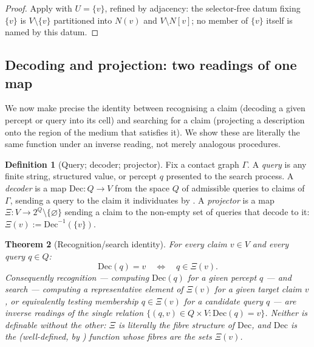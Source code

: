 \documentclass[11pt,twocolumn,a4paper]{article}
\theoremstyle{thmstyle}
\newtheorem{theorem}{Theorem}[section]
\theoremstyle{definition}
\newtheorem{definition}[theorem]{Definition}
\theoremstyle{remark}
\newcommand{\Gph}{\Gamma}
\newcommand{\V}{V}
\newcommand{\Proj}{\Xi}
\begin{document}
\begin{proof}
Apply  with $U=\{v\}$, refined by adjacency: the
selector-free datum fixing $\{v\}$ is $\V\setminus\{v\}$ partitioned into
$N(v)$ and $\V\setminus N[v]$; no member of $\{v\}$ itself is named by
this datum.
\end{proof}

\subsection{Decoding and projection: two readings of one map}

We now make precise the identity between recognising a claim (decoding a
given percept or query into its cell) and searching for a claim
(projecting a description onto the region of the medium that satisfies
it). We show these are literally the same function under an inverse
reading, not merely analogous procedures.

\begin{definition}[Query; decoder; projector]
\label{def:decoder}
Fix a contact graph $\Gph$. A \emph{query} is any finite string, structured
value, or percept $q$ presented to the search process. A \emph{decoder} is
a map $\mathrm{Dec}\colon Q\to\V$ from the space $Q$ of admissible queries
to claims of $\Gph$, sending a query to the claim it individuates by
. A \emph{projector} is a map
$\Proj\colon\V\to 2^{Q}\setminus\{\varnothing\}$ sending a claim to the
non-empty set of queries that decode to it: $\Proj(v):=\mathrm{Dec}^{-1}
(\{v\})$.
\end{definition}

\begin{theorem}[Recognition/search identity]
\label{thm:recognition-search}
For every claim $v\in\V$ and every query $q\in Q$:
\[
\mathrm{Dec}(q)=v \quad\Longleftrightarrow\quad q\in\Proj(v).
\]
Consequently \emph{recognition} --- computing $\mathrm{Dec}(q)$ for a given
percept $q$ --- and \emph{search} --- computing a representative element
of $\Proj(v)$ for a given target claim $v$, or equivalently testing
membership $q\in\Proj(v)$ for a candidate query $q$ --- are inverse
readings of the single relation
$\{(q,v)\in Q\times\V : \mathrm{Dec}(q)=v\}$. Neither is definable without
the other: $\Proj$ is literally the fibre structure of $\mathrm{Dec}$, and
$\mathrm{Dec}$ is the (well-defined, by ) function
whose fibres are the sets $\Proj(v)$.
\end{theorem}
\end{document}
